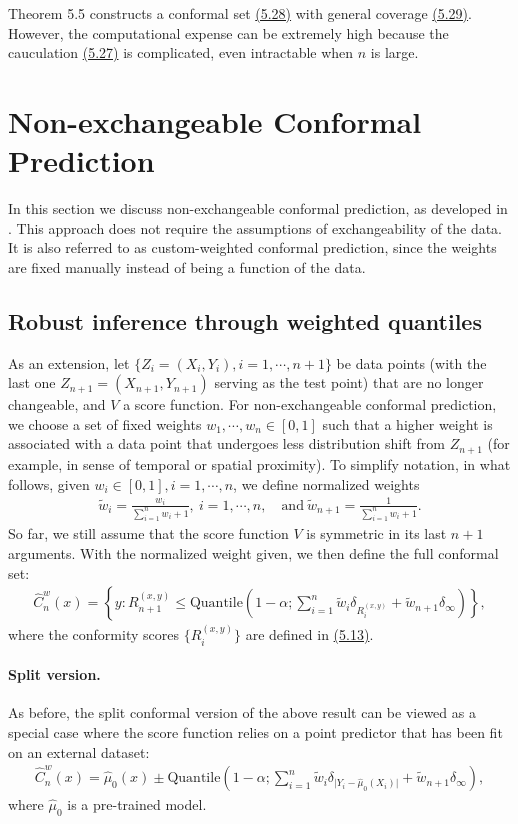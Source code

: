 \documentclass{article}
\numberwithin{equation}{section}
\begin{document}
Theorem 5.5 constructs a conformal set \hyperref[5.28]{(5.28)} with general coverage \hyperref[5.29]{(5.29)}. However, the computational expense can be extremely high because the cauculation \hyperref[5.27]{(5.27)} is complicated, even intractable when $n$ is large.

\section{Non-exchangeable Conformal Prediction}
In this section we discuss non-exchangeable conformal prediction, as developed in \cite{BCRT}. This approach does not require the assumptions of exchangeability of the data. It is also referred to as custom-weighted conformal prediction, since the weights are fixed manually instead of being a function of the data.

\subsection{Robust inference through weighted quantiles}
As an extension, let $\{Z_i = (X_i, Y_i), i = 1, \cdots, n + 1\}$ be data points (with the last one $Z_{n+1} = (X_{n+1}, Y_{n+1})$ serving as the test point) that are no longer changeable, and $V$ a score function. For non-exchangeable conformal prediction, we choose a set of fixed weights $w_1,\cdots,w_n\in [0,1]$ such that a higher weight is associated with a data point that undergoes less distribution shift from $Z_{n+1}$ (for example, in sense of temporal or spatial proximity). To simplify notation, in what follows, given $w_i\in[0,1],
i=1, \cdots, n$, we define normalized weights
\begin{align*}
	\widetilde{w}_i=\frac{w_i}{\sum_{i=1}^n w_i + 1},\  i=1,\cdots,n,\quad\text{and}\  \widetilde{w}_{n+1}=\frac{1}{\sum_{i=1}^n w_i + 1}.\tag{6.1}\label{6.1}
\end{align*}
So far, we still assume that the score function $V$ is symmetric in its last $n+1$ arguments. With the normalized weight given, we then define the full conformal set:
\begin{align*}
	\widehat{C}_n^w(x) = \left\{y:R_{n+1}^{(x,y)}\leq\mathrm{Quantile}\left(1-\alpha;\sum_{i=1}^n\widetilde{w}_i\delta_{R_i^{(x,y)}} + \widetilde{w}_{n+1}\delta_\infty\right)\right\},\tag{6.2}\label{6.2}
\end{align*}
where the conformity scores $\{R_i^{(x,y)}\}$ are defined in \hyperref[5.13]{(5.13)}.

\paragraph{Split version.} As before, the split conformal version of the above result can be viewed as a special case where the score function relies on a point predictor that has been fit on an external dataset:
\begin{align*}
	\widehat{C}_n^w(x) = \widehat{\mu}_0(x)\pm \mathrm{Quantile}\left(1-\alpha;\sum_{i=1}^n\widetilde{w}_i\delta_{\vert Y_i-\widehat{\mu}_0(X_i)\vert} + \widetilde{w}_{n+1}\delta_\infty\right),\tag{6.3}\label{6.3}
\end{align*}
where $\widehat{\mu}_0$ is a pre-trained model.
\end{document}
